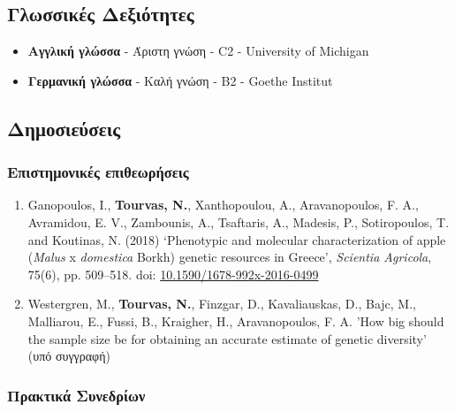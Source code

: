 \documentclass[12pt,]{scrartcl}
\begin{document}
\subsection{Γλωσσικές Δεξιότητες}\label{Γλώσσες}
\begin{itemize}
\vspace{-3mm}
%
\setlength\itemsep{-0.6em}
\item \textbf{Αγγλική γλώσσα} - Άριστη γνώση - C2 - University of Michigan

\item \textbf{Γερμανική γλώσσα} - Καλή γνώση - Β2 - Goethe Institut
\end{itemize}



\subsection{Δημοσιεύσεις}\label{publications}

\subsubsection{Επιστημονικές επιθεωρήσεις}\label{journals}
\vspace{-3mm}
\begin{enumerate}

\leftskip-0.07in
\item Ganopoulos, I., \textbf{Tourvas, N.}, Xanthopoulou, A., Aravanopoulos, F. A., Avramidou, E. V., Zambounis, A., Tsaftaris, A., Madesis, P., Sotiropoulos, T. and Koutinas, N. (2018) ‘Phenotypic and molecular characterization of apple (\textit{Malus} x \textit{domestica} Borkh) genetic resources in Greece’, \textit{Scientia Agricola}, 75(6), pp. 509–518. doi: \href{http://dx.doi.org/10.1590/1678-992x-2016-0499}{10.1590/1678-992x-2016-0499}

\item Westergren, M., \textbf{Tourvas, N.}, Finzgar, D., Kavaliauskas, D., Bajc, M., Malliarou, E., Fussi, B., Kraigher, H., Aravanopoulos, F. A. 'How big should the sample size be for obtaining an accurate estimate of genetic diversity' (υπό συγγραφή)
\end{enumerate}


\subsubsection{Πρακτικά Συνεδρίων}\label{conferences}
\end{document}
